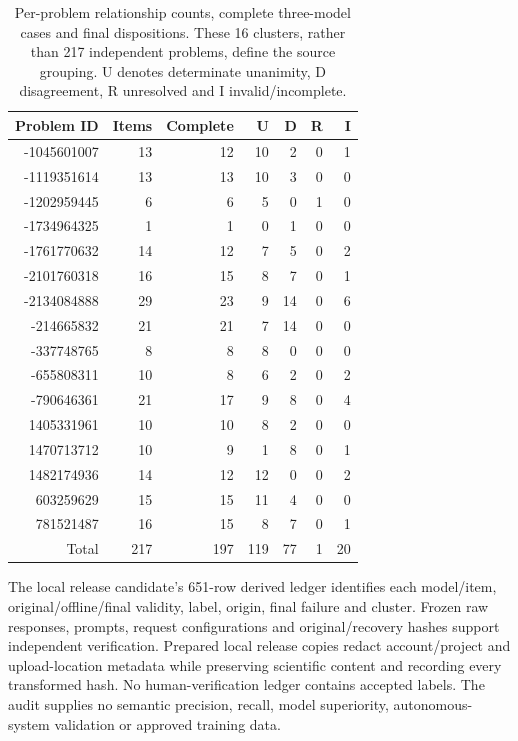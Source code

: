 \begin{table}[htbp]\centering\small
\caption{Per-problem relationship counts, complete three-model cases and final dispositions. These 16 clusters, rather than 217 independent problems, define the source grouping. U denotes determinate unanimity, D disagreement, R unresolved and I invalid/incomplete.}\label{tab:relationship-clusters}
\begin{tabular}{@{}rrrrrrr@{}}\toprule
Problem ID & Items & Complete & U & D & R & I\\\midrule
-1045601007 & 13 & 12 & 10 & 2 & 0 & 1\\
-1119351614 & 13 & 13 & 10 & 3 & 0 & 0\\
-1202959445 & 6 & 6 & 5 & 0 & 1 & 0\\
-1734964325 & 1 & 1 & 0 & 1 & 0 & 0\\
-1761770632 & 14 & 12 & 7 & 5 & 0 & 2\\
-2101760318 & 16 & 15 & 8 & 7 & 0 & 1\\
-2134084888 & 29 & 23 & 9 & 14 & 0 & 6\\
-214665832 & 21 & 21 & 7 & 14 & 0 & 0\\
-337748765 & 8 & 8 & 8 & 0 & 0 & 0\\
-655808311 & 10 & 8 & 6 & 2 & 0 & 2\\
-790646361 & 21 & 17 & 9 & 8 & 0 & 4\\
1405331961 & 10 & 10 & 8 & 2 & 0 & 0\\
1470713712 & 10 & 9 & 1 & 8 & 0 & 1\\
1482174936 & 14 & 12 & 12 & 0 & 0 & 2\\
603259629 & 15 & 15 & 11 & 4 & 0 & 0\\
781521487 & 16 & 15 & 8 & 7 & 0 & 1\\
\midrule
Total & 217 & 197 & 119 & 77 & 1 & 20\\\bottomrule
\end{tabular}\end{table}

The local release candidate's 651-row derived ledger identifies each model/item, original/offline/final validity, label, origin, final failure and cluster. Frozen raw responses, prompts, request configurations and original/recovery hashes support independent verification. Prepared local release copies redact account/project and upload-location metadata while preserving scientific content and recording every transformed hash. No human-verification ledger contains accepted labels. The audit supplies no semantic precision, recall, model superiority, autonomous-system validation or approved training data.

